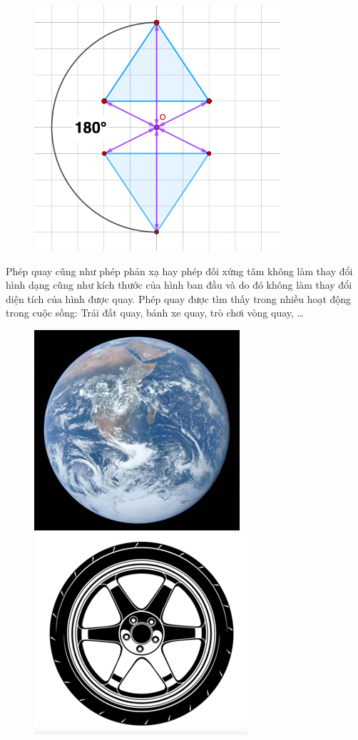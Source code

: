 \begin{multicols}{2}
\begin{figure}[H]
		\vspace*{-5pt}
		\centering
		\captionsetup{labelformat= empty, justification=centering}
		\includegraphics[width= 0.65\linewidth]{Picture22}
		\vspace*{-10pt}
	\end{figure}
	Phép quay cũng như phép phản xạ hay phép đối xứng tâm không làm thay đổi hình dạng cũng như kích thước của hình ban đầu và do đó không làm thay đổi diện tích của hình được quay.
	\vskip 0.1cm
	Phép quay được tìm thấy trong nhiều hoạt động trong cuộc sống: Trái đất quay, bánh xe quay, trò chơi vòng quay, \ldots 
	\begin{figure}[H]
		\vspace*{5pt}
		\centering
		\captionsetup{labelformat= empty, justification=centering}
		\includegraphics[height= 0.46\linewidth]{Picture23}\,\,
		\includegraphics[height= 0.46\linewidth]{Picture24}

\end{figure}
\end{multicols}
